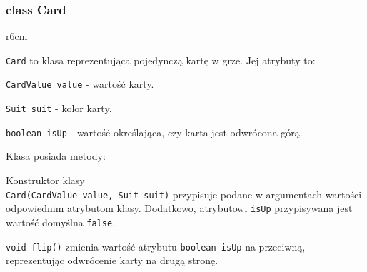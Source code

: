 \documentclass{article}
\begin{document}
\begin{center}
\end{center}

\newpage

\subsubsection*{class Card}

\begin{wrapfigure}{r}{6cm}
\end{wrapfigure}

\texttt{Card} to klasa reprezentująca pojedynczą kartę w grze. Jej atrybuty to:

\texttt{CardValue value} - wartość karty.

\texttt{Suit suit} - kolor karty.

\texttt{boolean isUp} - wartość określająca, czy karta jest odwrócona górą.

Klasa posiada metody:

Konstruktor klasy\\\texttt{Card(CardValue value, Suit suit)} przypisuje podane w argumentach wartości odpowiednim atrybutom klasy. Dodatkowo, atrybutowi \texttt{isUp} przypisywana jest wartość domyślna \texttt{false}.

\texttt{void flip()} zmienia wartość atrybutu \texttt{boolean isUp} na przeciwną, reprezentując odwrócenie karty na drugą stronę.
\end{document}
